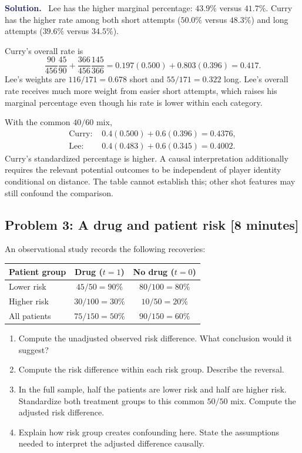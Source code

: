 \documentclass[11pt]{article}
\newenvironment{answer}{%
    \par\medskip\noindent\textcolor{MidnightBlue}{\textbf{Solution.}}\ }
    {\par\medskip}
\newcommand{\workingspace}[1]{}
\newcommand{\workingspace}[1]{\vspace{#1}}
\begin{document}
\begin{answer}
Lee has the higher marginal percentage: $43.9\%$ versus $41.7\%$. Curry has the
higher rate among both short attempts ($50.0\%$ versus $48.3\%$) and long
attempts ($39.6\%$ versus $34.5\%$).

Curry's overall rate is
\[
  \frac{90}{456}\frac{45}{90}
  +\frac{366}{456}\frac{145}{366}
  =0.197(0.500)+0.803(0.396)=0.417.
\]
Lee's weights are $116/171=0.678$ short and $55/171=0.322$ long. Lee's overall
rate receives much more weight from easier short attempts, which raises his
marginal percentage even though his rate is lower within each category.

With the common $40/60$ mix,
\begin{align*}
  \text{Curry: }&0.4(0.500)+0.6(0.396)=0.4376,\\
  \text{Lee: }&0.4(0.483)+0.6(0.345)=0.4002.
\end{align*}
Curry's standardized percentage is higher. A causal interpretation additionally
requires the relevant potential outcomes to be independent of player identity
conditional on distance. The table cannot establish this; other shot features
may still confound the comparison.
\end{answer}

\newpage
\subsection*{Problem 3: A drug and patient risk \hfill [8 minutes]}
An observational study records the following recoveries:
\begin{center}
\begin{tabular}{@{}lcc@{}}
\toprule
Patient group & Drug ($t=1$) & No drug ($t=0$) \\
\midrule
Lower risk & $45/50=90\%$ & $80/100=80\%$ \\
Higher risk & $30/100=30\%$ & $10/50=20\%$ \\
\midrule
All patients & $75/150=50\%$ & $90/150=60\%$ \\
\bottomrule
\end{tabular}
\end{center}
\begin{enumerate}[label=(\alph*),itemsep=0.45em]
  \item Compute the unadjusted observed risk difference. What conclusion would
        it suggest?
  \item Compute the risk difference within each risk group. Describe the reversal.
  \item In the full sample, half the patients are lower risk and half are higher
        risk. Standardize both treatment groups to this common $50/50$ mix.
        Compute the adjusted risk difference.
  \item Explain how risk group creates confounding here. State the assumptions
        needed to interpret the adjusted difference causally.
\end{enumerate}
\workingspace{5.5cm}
\end{document}
